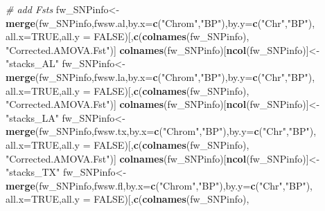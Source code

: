 \documentclass[11pt,]{article}
\newenvironment{Shaded}{\begin{snugshade}}{\end{snugshade}}
\newcommand{\KeywordTok}[1]{\textcolor[rgb]{0.13,0.29,0.53}{\textbf{#1}}}
\newcommand{\DataTypeTok}[1]{\textcolor[rgb]{0.13,0.29,0.53}{#1}}
\newcommand{\StringTok}[1]{\textcolor[rgb]{0.31,0.60,0.02}{#1}}
\newcommand{\CommentTok}[1]{\textcolor[rgb]{0.56,0.35,0.01}{\textit{#1}}}
\newcommand{\OtherTok}[1]{\textcolor[rgb]{0.56,0.35,0.01}{#1}}
\newcommand{\NormalTok}[1]{#1}
\begin{document}
\begin{Shaded}
\begin{Highlighting}[]
\CommentTok{# add Fsts}
\NormalTok{fw_SNPinfo<-}\KeywordTok{merge}\NormalTok{(fw_SNPinfo,fwsw.al,}\DataTypeTok{by.x=}\KeywordTok{c}\NormalTok{(}\StringTok{"Chrom"}\NormalTok{,}\StringTok{"BP"}\NormalTok{),}\DataTypeTok{by.y=}\KeywordTok{c}\NormalTok{(}\StringTok{"Chr"}\NormalTok{,}\StringTok{"BP"}\NormalTok{),}
                  \DataTypeTok{all.x=}\OtherTok{TRUE}\NormalTok{,}\DataTypeTok{all.y =} \OtherTok{FALSE}\NormalTok{)[,}\KeywordTok{c}\NormalTok{(}\KeywordTok{colnames}\NormalTok{(fw_SNPinfo),}
                                               \StringTok{"Corrected.AMOVA.Fst"}\NormalTok{)] }
\KeywordTok{colnames}\NormalTok{(fw_SNPinfo)[}\KeywordTok{ncol}\NormalTok{(fw_SNPinfo)]<-}\StringTok{"stacks_AL"}
\NormalTok{fw_SNPinfo<-}\KeywordTok{merge}\NormalTok{(fw_SNPinfo,fwsw.la,}\DataTypeTok{by.x=}\KeywordTok{c}\NormalTok{(}\StringTok{"Chrom"}\NormalTok{,}\StringTok{"BP"}\NormalTok{),}\DataTypeTok{by.y=}\KeywordTok{c}\NormalTok{(}\StringTok{"Chr"}\NormalTok{,}\StringTok{"BP"}\NormalTok{),}
                  \DataTypeTok{all.x=}\OtherTok{TRUE}\NormalTok{,}\DataTypeTok{all.y =} \OtherTok{FALSE}\NormalTok{)[,}\KeywordTok{c}\NormalTok{(}\KeywordTok{colnames}\NormalTok{(fw_SNPinfo),}
                                               \StringTok{"Corrected.AMOVA.Fst"}\NormalTok{)] }
\KeywordTok{colnames}\NormalTok{(fw_SNPinfo)[}\KeywordTok{ncol}\NormalTok{(fw_SNPinfo)]<-}\StringTok{"stacks_LA"}
\NormalTok{fw_SNPinfo<-}\KeywordTok{merge}\NormalTok{(fw_SNPinfo,fwsw.tx,}\DataTypeTok{by.x=}\KeywordTok{c}\NormalTok{(}\StringTok{"Chrom"}\NormalTok{,}\StringTok{"BP"}\NormalTok{),}\DataTypeTok{by.y=}\KeywordTok{c}\NormalTok{(}\StringTok{"Chr"}\NormalTok{,}\StringTok{"BP"}\NormalTok{),}
                  \DataTypeTok{all.x=}\OtherTok{TRUE}\NormalTok{,}\DataTypeTok{all.y =} \OtherTok{FALSE}\NormalTok{)[,}\KeywordTok{c}\NormalTok{(}\KeywordTok{colnames}\NormalTok{(fw_SNPinfo),}
                                               \StringTok{"Corrected.AMOVA.Fst"}\NormalTok{)] }
\KeywordTok{colnames}\NormalTok{(fw_SNPinfo)[}\KeywordTok{ncol}\NormalTok{(fw_SNPinfo)]<-}\StringTok{"stacks_TX"}
\NormalTok{fw_SNPinfo<-}\KeywordTok{merge}\NormalTok{(fw_SNPinfo,fwsw.fl,}\DataTypeTok{by.x=}\KeywordTok{c}\NormalTok{(}\StringTok{"Chrom"}\NormalTok{,}\StringTok{"BP"}\NormalTok{),}\DataTypeTok{by.y=}\KeywordTok{c}\NormalTok{(}\StringTok{"Chr"}\NormalTok{,}\StringTok{"BP"}\NormalTok{),}
                  \DataTypeTok{all.x=}\OtherTok{TRUE}\NormalTok{,}\DataTypeTok{all.y =} \OtherTok{FALSE}\NormalTok{)[,}\KeywordTok{c}\NormalTok{(}\KeywordTok{colnames}\NormalTok{(fw_SNPinfo),}

\end{Highlighting}
\end{Shaded}
\end{document}
